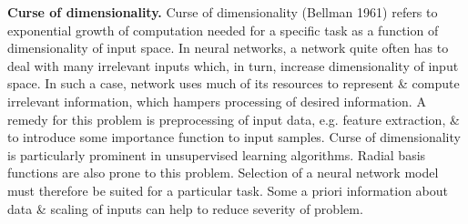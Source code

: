 \documentclass{article}
\begin{document}
\begin{enumerate}
\begin{itemize}
\begin{itemize}
\begin{itemize}
				{\bf Curse of dimensionality.} Curse of dimensionality (Bellman 1961) refers to exponential growth of computation needed for a specific task as a function of dimensionality of input space. In neural networks, a network quite often has to deal with many irrelevant inputs which, in turn, increase dimensionality of input space. In such a case, network uses much of its resources to represent \& compute irrelevant information, which hampers processing of desired information. A remedy for this problem is preprocessing of input data, e.g. feature extraction, \& to introduce some importance function to input samples. Curse of dimensionality is particularly prominent in unsupervised learning algorithms. Radial basis functions are also prone to this problem. Selection of a neural network model must therefore be suited for a particular task. Some a priori information about data \& scaling of inputs can help to reduce severity of problem.
				

\end{itemize}
\end{itemize}
\end{itemize}
\end{enumerate}
\end{document}
